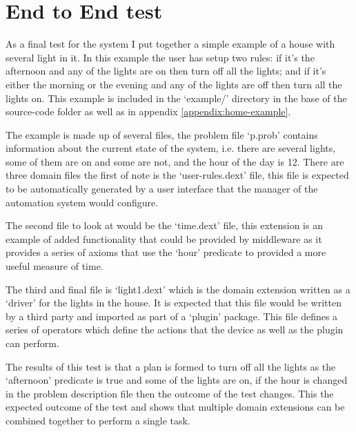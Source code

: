 \section{End to End test}
\label{section:end-to-end}
As a final test for the system I put together a simple example of a house with
several light in it. In this example the user has setup two rules: if it's the
afternoon and any of the lights are on then turn off all the lights; and if it's
either the morning or the evening and any of the lights are off then turn all
the lights on. This example is included in the `example/' directory in the base
of the source-code folder as well as in appendix \ref{appendix:home-example}.

The example is made up of several files, the problem file `p.prob' contains
information about the current state of the system, i.e. there are several
lights, some of them are on and some are not, and the hour of the day is 12.
There are three domain files the first of note is the `user-rules.dext' file,
this file is expected to be automatically generated by a user interface that the
manager of the automation system would configure.

The second file to look at would be the `time.dext' file, this extension is an
example of added functionality that could be provided by middleware as it
provides a series of axioms that use the `hour' predicate to provided a more
useful measure of time.

The third and final file is `light1.dext' which is the domain extension written
as a `driver' for the lights in the house. It is expected that this file would
be written by a third party and imported as part of a `plugin' package. This
file defines a series of operators which define the actions that the device as
well as the plugin can perform.

The results of this test is that a plan is formed to turn off all the lights as
the `afternoon' predicate is true and some of the lights are on, if the hour is
changed in the problem description file then the outcome of the test changes.
This the expected outcome of the test and shows that multiple domain extensions
can be combined together to perform a single task.

